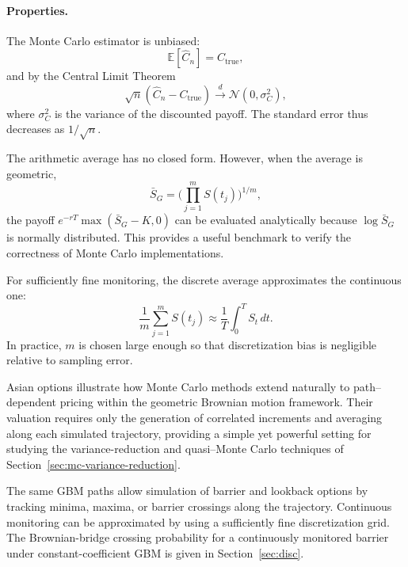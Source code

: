 \paragraph{Properties.}
The Monte Carlo estimator is unbiased:
\[
\mathbb E[\widehat{C}_n] = C_{\text{true}},
\]
and by the Central Limit Theorem
\[
\sqrt{n}(\widehat{C}_n - C_{\text{true}}) \xrightarrow{d} \mathcal N(0, \sigma_C^2),
\]
where $\sigma_C^2$ is the variance of the discounted payoff.
The standard error thus decreases as \(1/\sqrt{n}\).

\begin{remark}
The arithmetic average has no closed form.  
However, when the average is geometric,
\[
\bar S_G = \Big(\prod_{j=1}^m S(t_j)\Big)^{1/m},
\]
the payoff \(e^{-rT}\max(\bar S_G - K,0)\) can be evaluated analytically because \(\log \bar S_G\) is normally distributed.  
This provides a useful benchmark to verify the correctness of Monte Carlo implementations.
\end{remark}

\begin{remark}[Discretization]
For sufficiently fine monitoring, the discrete average approximates the continuous one:
\[
\frac{1}{m}\sum_{j=1}^{m} S(t_j) \approx \frac{1}{T}\int_0^T S_t\,dt.
\]
In practice, $m$ is chosen large enough so that discretization bias is negligible relative to sampling error.
\end{remark}

\begin{remark}[Summary]
Asian options illustrate how Monte Carlo methods extend naturally to path--dependent pricing within the geometric Brownian motion framework.  
Their valuation requires only the generation of correlated increments and averaging along each simulated trajectory, 
providing a simple yet powerful setting for studying the variance-reduction and quasi--Monte Carlo techniques of Section~\ref{sec:mc-variance-reduction}.
\end{remark}

\begin{remark}
The same GBM paths allow simulation of barrier and lookback options by tracking minima, maxima, or barrier crossings along the trajectory.
Continuous monitoring can be approximated by using a sufficiently fine discretization grid. The Brownian-bridge crossing probability for a continuously monitored barrier under constant-coefficient GBM is given in Section~\ref{sec:disc}.
\end{remark}
